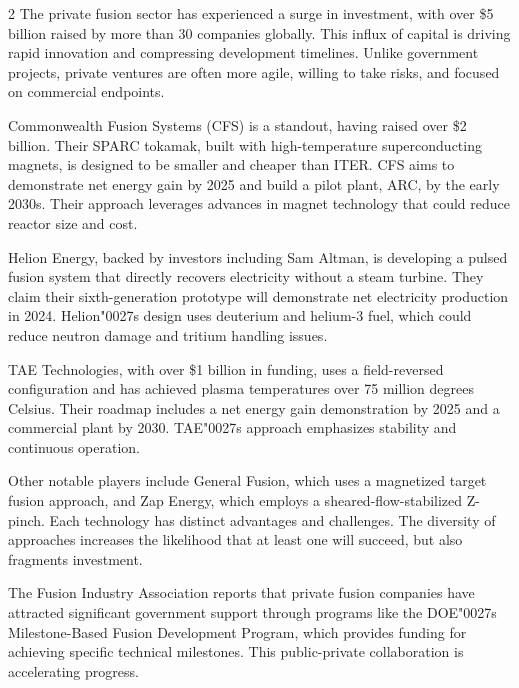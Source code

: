 \documentclass[10pt,a4paper]{article}
\newcommand{\BOApos}{{\BOQuoteFont\char"0027}}
\begin{document}
\begin{multicols}{2}
{\small The private fusion sector has experienced a surge in investment, with over \$5 billion raised by more than 30 companies globally. This influx of capital is driving rapid innovation and compressing development timelines. Unlike government projects, private ventures are often more agile, willing to take risks, and focused on commercial endpoints.}\par
{\small Commonwealth Fusion Systems (CFS) is a standout, having raised over \$2 billion. Their SPARC tokamak, built with high-temperature superconducting magnets, is designed to be smaller and cheaper than ITER. CFS aims to demonstrate net energy gain by 2025 and build a pilot plant, ARC, by the early 2030s. Their approach leverages advances in magnet technology that could reduce reactor size and cost.}\par
{\small Helion Energy, backed by investors including Sam Altman, is developing a pulsed fusion system that directly recovers electricity without a steam turbine. They claim their sixth-generation prototype will demonstrate net electricity production in 2024. Helion\BOApos{}s design uses deuterium and helium-3 fuel, which could reduce neutron damage and tritium handling issues.}\par
{\small TAE Technologies, with over \$1 billion in funding, uses a field-reversed configuration and has achieved plasma temperatures over 75 million degrees Celsius. Their roadmap includes a net energy gain demonstration by 2025 and a commercial plant by 2030. TAE\BOApos{}s approach emphasizes stability and continuous operation.}\par
{\small Other notable players include General Fusion, which uses a magnetized target fusion approach, and Zap Energy, which employs a sheared-flow-stabilized Z-pinch. Each technology has distinct advantages and challenges. The diversity of approaches increases the likelihood that at least one will succeed, but also fragments investment.}\par
{\small The Fusion Industry Association reports that private fusion companies have attracted significant government support through programs like the DOE\BOApos{}s Milestone-Based Fusion Development Program, which provides funding for achieving specific technical milestones. This public-private collaboration is accelerating progress.}\par
\end{multicols}
\label{chap:2:end}
\end{document}
